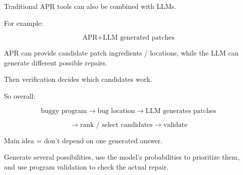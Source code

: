 \documentclass[11pt]{article}
\begin{document}
\vspace{8pt}

Traditional APR tools can also be combined with LLMs.

For example:

\[
\text{APR}
+
\text{LLM generated patches}
\]

APR can provide candidate patch ingredients /
locations, while the LLM can generate different
possible repairs.

Then verification decides which candidates work.

\vspace{8pt}

So overall:

\[
\text{buggy program}
\rightarrow
\text{bug location}
\rightarrow
\text{LLM generates patches}
\]

\[
\rightarrow
\text{rank / select candidates}
\rightarrow
\text{validate}
\]

Main idea = don't depend on one generated answer.

Generate several possibilities, use the model's
probabilities to prioritize them, and use program
validation to check the actual repair.
\end{document}
